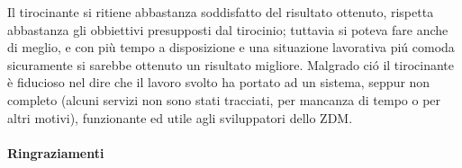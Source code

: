 \documentclass[a4paper,12pt,titlepage,italian,openany]{report}
\begin{document}
Il tirocinante si ritiene abbastanza soddisfatto del risultato ottenuto, rispetta abbastanza gli obbiettivi presupposti dal tirocinio; tuttavia si poteva fare anche di meglio, e con più tempo a disposizione e una situazione lavorativa piú comoda sicuramente si sarebbe ottenuto un risultato migliore. 
Malgrado ció il tirocinante è fiducioso nel dire che il lavoro svolto ha portato ad un sistema, seppur non completo (alcuni servizi non sono stati tracciati, per mancanza di tempo o per altri motivi), funzionante ed utile agli sviluppatori dello ZDM\cite{zdm:1}.


\appendix



 
\paragraph{Ringraziamenti}
\end{document}
